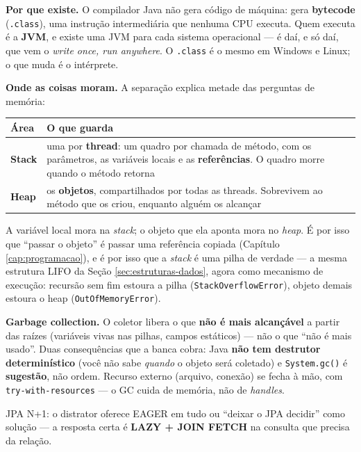 \begin{conceito}
\textbf{Por que existe.} O compilador Java não gera código de máquina: gera
\textbf{bytecode} (\texttt{.class}), uma instrução intermediária que nenhuma CPU
executa. Quem executa é a \textbf{JVM}, e existe uma JVM para cada sistema
operacional --- é daí, e só daí, que vem o \emph{write once, run anywhere}. O
\texttt{.class} é o mesmo em Windows e Linux; o que muda é o intérprete.

\textbf{Onde as coisas moram.} A separação explica metade das perguntas de
memória:

\begin{center}
\begin{tabular}{@{}p{2.2cm}p{9.4cm}@{}}
\toprule
\textbf{Área} & \textbf{O que guarda} \\
\midrule
\textbf{Stack} & uma por \textbf{thread}: um quadro por chamada de método, com
os parâmetros, as variáveis locais e as \textbf{referências}. O quadro morre
quando o método retorna \\
\textbf{Heap} & os \textbf{objetos}, compartilhados por todas as threads.
Sobrevivem ao método que os criou, enquanto alguém os alcançar \\
\bottomrule
\end{tabular}
\end{center}

A variável local mora na \emph{stack}; o objeto que ela aponta mora no
\emph{heap}. É por isso que ``passar o objeto'' é passar uma referência
copiada (Capítulo \ref{cap:programacao}), e é por isso que a \emph{stack} é
uma pilha de verdade --- a mesma estrutura LIFO da Seção
\ref{sec:estruturas-dados}, agora como mecanismo de execução: recursão sem fim
estoura a pilha (\texttt{StackOverflowError}), objeto demais estoura o heap
(\texttt{OutOfMemoryError}).

\textbf{Garbage collection.} O coletor libera o que \textbf{não é mais
alcançável} a partir das raízes (variáveis vivas nas pilhas, campos estáticos)
--- não o que ``não é mais usado''. Duas consequências que a banca cobra: Java
\textbf{não tem destrutor determinístico} (você não sabe \emph{quando} o objeto
será coletado) e \texttt{System.gc()} é \textbf{sugestão}, não ordem. Recurso
externo (arquivo, conexão) se fecha à mão, com \texttt{try-with-resources} ---
o GC cuida de memória, não de \emph{handles}.
\end{conceito}

\begin{pegadinha}
JPA N+1: o distrator oferece EAGER em tudo ou ``deixar o JPA decidir'' como
solução --- a resposta certa é \textbf{LAZY + JOIN FETCH} na consulta que
precisa da relação.
\end{pegadinha}

